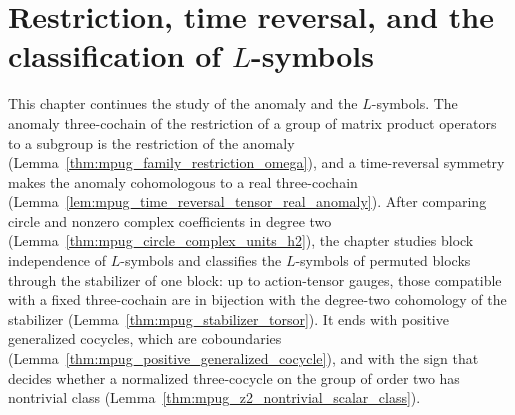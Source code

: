 \chapter{Restriction, time reversal, and the classification of \texorpdfstring{$L$}{L}-symbols}
\label{ch:mpu_cocycles_l_symbol_classification}

This chapter continues the study of the anomaly and the $L$-symbols. The
anomaly three-cochain of the restriction of a group of matrix product
operators to a subgroup is the restriction of the anomaly
(Lemma~\ref{thm:mpug_family_restriction_omega}), and a time-reversal symmetry
makes the anomaly cohomologous to a real three-cochain
(Lemma~\ref{lem:mpug_time_reversal_tensor_real_anomaly}). After comparing
circle and nonzero complex coefficients in degree two
(Lemma~\ref{thm:mpug_circle_complex_units_h2}), the chapter studies block
independence of $L$-symbols and classifies the $L$-symbols of permuted blocks
through the stabilizer of one block: up to action-tensor gauges, those
compatible with a fixed three-cochain are in bijection with the degree-two
cohomology of the stabilizer (Lemma~\ref{thm:mpug_stabilizer_torsor}). It ends
with positive generalized cocycles, which are coboundaries
(Lemma~\ref{thm:mpug_positive_generalized_cocycle}), and with the sign that
decides whether a normalized three-cocycle on the group of order two has
nontrivial class (Lemma~\ref{thm:mpug_z2_nontrivial_scalar_class}).


